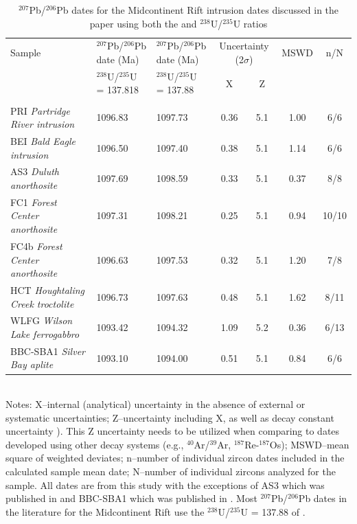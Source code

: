 \documentclass[11pt,letterpaper]{article}
\begin{document}
\renewcommand{\thetable}{DR\arabic{table}}
\addtocounter{table}{1}
\begin{table}[h!]
\footnotesize
\caption{$^{207}$Pb/$^{206}$Pb dates for the Midcontinent Rift intrusion dates discussed in the paper using both the \cite{Steiger1977a} and \cite{Hiess2012a} $^{238}$U/$^{235}$U ratios}
\begin{tabular}{|p{3 cm}|p{3.4 cm}|p{3.4 cm}|cc|c|c|}
\hline
Sample & $^{207}$Pb/$^{206}$Pb date (Ma) & $^{207}$Pb/$^{206}$Pb date (Ma) & \multicolumn{2}{|c|}{Uncertainty (2$\sigma$)} & MSWD & n/N \\
 &  $^{238}$U/$^{235}$U = 137.818 & $^{238}$U/$^{235}$U = 137.88 & X & Z & & \\
  &  \cite{Hiess2012a} & \cite{Steiger1977a} &  & & & \\
\hline
PRI \textit{Partridge River intrusion}  & 1096.83 & 1097.73  & 0.36 & 5.1 & 1.00 & 6/6 \\
\hline
BEI \textit{Bald Eagle intrusion} &  1096.50 & 1097.40 & 0.38 & 5.1 & 1.14 & 6/6 \\
\hline
AS3 \textit{Duluth anorthosite} &  1097.69 &  1098.59 & 0.33 & 5.1 & 0.37 & 8/8 \\
\hline
FC1 \textit{Forest Center anorthosite}   & 1097.31 & 1098.21 & 0.25 & 5.1 & 0.94 & 10/10 \\
\hline
FC4b \textit{Forest Center anorthosite}   & 1096.63 & 1097.53 & 0.32 & 5.1 & 1.20 & 7/8 \\
\hline
HCT \textit{Houghtaling Creek troctolite}   & 1096.73 & 1097.63 & 0.48 & 5.1 & 1.62 & 8/11 \\
\hline
WLFG \textit{Wilson Lake ferrogabbro}   & 1093.42 & 1094.32 & 1.09 & 5.2 & 0.36 & 6/13 \\
\hline
BBC-SBA1 \textit{Silver Bay aplite}  &  1093.10 & 1094.00 & 0.51 &5.1 & 0.84 & 6/6 \\
\hline
\end{tabular}\\

Notes: X--internal (analytical) uncertainty in the absence of external or systematic uncertainties; Z--uncertainty including X, as well as decay constant uncertainty \citep{Jaffey1971a}). This Z uncertainty needs to be utilized when comparing to dates developed using other decay systems (e.g., $^{40}$Ar/$^{39}$Ar, $^{187}$Re-$^{187}$Os); MSWD--mean square of weighted deviates; n--number of individual zircon dates included in the calculated sample mean date; N--number of individual zircons analyzed for the sample. All dates are from this study with the exceptions of AS3 which was published in \cite{Schoene2006a} and BBC-SBA1 which was published in \cite{Fairchild2017a}. Most $^{207}$Pb/$^{206}$Pb dates in the literature for the Midcontinent Rift use the $^{238}$U/$^{235}$U = 137.88 of \citet{Steiger1977a}.
\label{tab:geochron}
\end{table}
\end{document}
